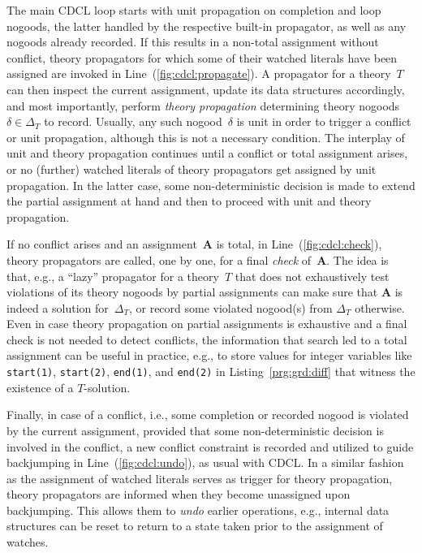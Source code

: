 \documentclass[a4paper,USenglish]{oasics-v2016}
\newcommand{\Ass}{\ensuremath{\mathbf{A}}}
\begin{document}
The main CDCL loop starts with unit propagation on completion and loop nogoods,
the latter handled by the respective built-in propagator, as well as any nogoods
already recorded.
If this results in a non-total assignment without conflict,
theory propagators for which some of their watched literals have been assigned
are invoked in Line~(\ref{fig:cdcl:propagate}).
A propagator for a theory~$T$ can then inspect the current assignment,
update its data structures accordingly, and most importantly,
perform \emph{theory propagation} determining theory nogoods $\delta\in\Delta_T$ to record.
Usually, any such nogood~$\delta$ is unit in order to trigger a conflict or unit propagation,
although this is not a necessary condition.
The interplay of unit and theory propagation continues until a conflict or
total assignment arises,
or no (further) watched literals of theory propagators get assigned by unit propagation.
In the latter case, some non-deterministic decision is made to extend the partial
assignment at hand and then to proceed with unit and theory propagation.

If no conflict arises and an assignment~$\Ass$ is total,
in Line~(\ref{fig:cdcl:check}), theory propagators are called, one by one,
for a final \emph{check} of~$\Ass$.
The idea is that, e.g., a ``lazy'' propagator for a theory~$T$
that does not exhaustively test violations of its theory nogoods by partial assignments
can make sure that $\Ass$ is indeed a solution for~$\Delta_T$, or record some
violated nogood(s) from $\Delta_T$ otherwise.
Even in case theory propagation on partial assignments is exhaustive and a final
check is not needed to detect conflicts,
the information that search led to a total assignment can be useful in practice, e.g.,
to store %
values for integer variables like
\lstinline{start(1)},
\lstinline{start(2)},
\lstinline{end(1)}, and
\lstinline{end(2)} in Listing~\ref{prg:grd:diff}
that witness the existence of a $T$-solution.

Finally, in case of a conflict, i.e., some completion or recorded nogood is violated by
the current assignment,
provided that some non-deterministic decision is involved in the conflict,
a new conflict constraint is recorded and utilized to guide backjumping
in Line~(\ref{fig:cdcl:undo}), as usual with CDCL.
In a similar fashion as the assignment of watched literals serves as
trigger for theory propagation, theory propagators are informed when they become
unassigned upon backjumping.
This allows them to \emph{undo} earlier operations, e.g., internal data structures can be
reset to return   to a state taken prior to the assignment of watches.
\end{document}
